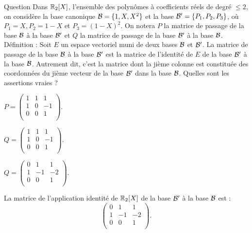 \begin{multi}[multiple,feedback=
{Par définition, \(P\) est la matrice de l'application identité de \(\Rr_2[X]\) de la base \({\cal {B'}}\) à la base \({\cal {B}}\) :
\[P= \left(\begin{array}{rcc}
0&1&1\\1&-1&-2\\ 0&0&1\end{array}\right)\quad \mbox{et}\quad
Q = \left(\begin{array}{rcc}1&1&1\\
1&0&-1\\ 0&0&1\end{array}\right).\]
}]{Question}
Dans \(\Rr_2[X]\), l'ensemble des polynômes à coefficients réels de degré \(\le 2\), on considère la base canonique \({\cal {B}} =\{1,X,X^2\}\) et  la base \({\cal {B'}} =\{P_1,P_2,P_3\}\), où 
\(P_1=X, P_2=1-X\) et \(P_3=(1-X)^2\). On notera \(P\) la matrice de passage de la base \({\cal {B}}\) à la base \({\cal {B'}}\) et \(Q\) la matrice de passage de la base \({\cal {B'}}\) à la base \({\cal {B}}\).
\vskip1mm
Définition : Soit \(E\) un espace vectoriel muni de deux bases \({\cal {B}}\) et \({\cal {B}}'\). La matrice de passage de la base \({\cal {B}}\) à la base  \({\cal {B}}'\) est la matrice de l'identité de \(E\) de la base \({\cal {B}}'\) à la base  \({\cal {B}}\). Autrement dit, c'est la matrice dont la jième colonne est constituée des coordonnées du jième vecteur de la base \({\cal {B}'}\) dans la base  \({\cal {B}}\).
\vskip1mm
Quelles sont les assertions vraies ?

    \item \(P = \left(\begin{array}{rcc}
1&1&1\\
1&0&-1\\
0&0&1\\
\end{array}\right).\)
    \item* \(Q = \left(\begin{array}{rcc}
1&1&1\\
1&0&-1\\
0&0&1\\
\end{array}\right).\)
    \item \(Q = \left(\begin{array}{rcc}
0&1&1\\
1&-1&-2\\
0&0&1\\
\end{array}\right).\)
    \item* La matrice de l'application identité de \(\Rr_2[X]\) de la base \({\cal {B'}}\) à la base \({\cal {B}}\) est :
\[\left(\begin{array}{rcc}
0&1&1\\
1&-1&-2\\
0&0&1\\
\end{array}\right).\]
\end{multi}


